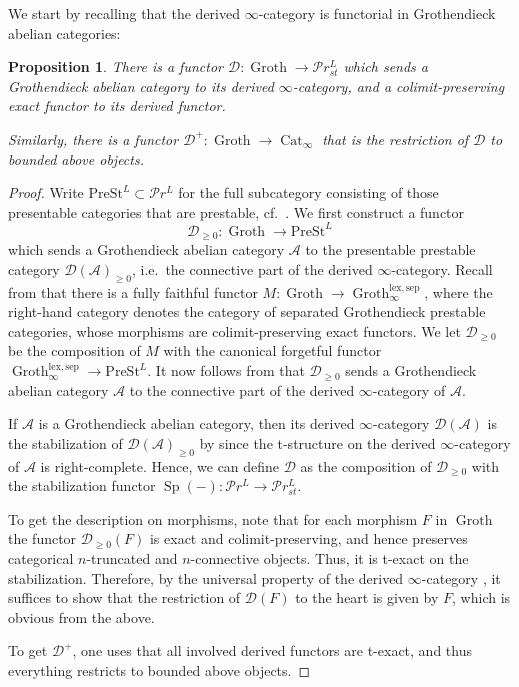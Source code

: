 \documentclass{article}
\theoremstyle{definition}
\theoremstyle{definition}
\theoremstyle{definition}
\theoremstyle{plain}
\theoremstyle{plain}
\theoremstyle{plain}
\theoremstyle{plain}
\theoremstyle{plain}
\theoremstyle{plain}
\newtheorem{prop}[defn]{Proposition}
\theoremstyle{plain}
\theoremstyle{plain}
\theoremstyle{remark}
\theoremstyle{remark}
\theoremstyle{plain}
\theoremstyle{plain}
\theoremstyle{plain}
\theoremstyle{plain}
\theoremstyle{plain}
\newcommand{\Sp}{\operatorname{Sp}}
\newcommand{\Cat}[1]{\mathcal{#1}}
\newcommand{\CatInf}{\operatorname{Cat}_{\infty}}
\newcommand{\Groth}{\operatorname{Groth}}
\newcommand{\PrL}{\mathcal{P}r^{L}}
\newcommand{\PrSt}{\mathcal{P}r^{L}_{st}}
\newcommand{\PreSt}{\mathrm{PreSt}^L}
\begin{document}
We start by recalling that the derived $\infty$-category is functorial in Grothendieck abelian categories:
\begin{prop} \label{lem:zariski:derived-cat}
    There is a functor $\Cat D \colon \Groth \to \PrSt$ 
    which sends a Grothendieck abelian category to its derived $\infty$-category,
    and a colimit-preserving exact functor
    to its derived functor.

    Similarly, there is a functor $\Cat D^+ \colon \Groth \to \CatInf$ 
    that is the restriction of $\Cat D$ to bounded above objects.
\end{prop}
\begin{proof}
    Write $\PreSt \subset \PrL$ for the full subcategory consisting of those 
    presentable categories that are prestable, cf.\ \cite[Definition C.1.2.1]{sag}.
    We first construct a functor 
    \begin{equation*}
        \Cat D_{\ge 0} \colon \Groth \to \PreSt
    \end{equation*}
    which sends a Grothendieck abelian category $\Cat A$
    to the presentable prestable category $\Cat D(\Cat A)_{\ge 0}$,
    i.e.\ the connective part of the derived $\infty$-category.
    Recall from \cite[Proposition C.5.4.5]{sag}
    that there is a fully faithful functor $M \colon \Groth \to \Groth^{\mathrm{lex}, \mathrm{sep}}_\infty$,
    where the right-hand category denotes the category of separated Grothendieck prestable 
    categories, whose morphisms are colimit-preserving exact functors.
    We let $\Cat D_{\ge 0}$ be the composition of $M$ with the canonical forgetful functor $\Groth^{\mathrm{lex}, \mathrm{sep}}_\infty \to \PreSt$.
    It now follows from \cite[Propositions C.5.4.5 and C.5.3.2]{sag}
    that $\Cat D_{\ge 0}$ sends a Grothendieck abelian category $\Cat A$ to the connective part of the derived $\infty$-category of $\Cat A$.

    If $\Cat A$ is a Grothendieck abelian category,
    then its derived $\infty$-category $\Cat D(\Cat A)$ is the stabilization of $\Cat D(\Cat A)_{\ge 0}$
    by \cite[Remark C.1.2.10]{sag} since the t-structure on the derived $\infty$-category of $\Cat A$ is right-complete.
    Hence, we can define $\Cat D$ as the composition of $\Cat D_{\ge 0}$ with the stabilization functor 
    $\Sp(-) \colon \PrL \to \PrSt$.

    To get the description on morphisms, note that for each morphism $F$ in $\Groth$ the functor
    $\Cat D_{\ge 0}(F)$ is exact and colimit-preserving,
    and hence preserves categorical $n$-truncated and $n$-connective objects.
    Thus, it is t-exact on the stabilization.
    Therefore, by the universal property of the derived $\infty$-category \cite[Proposition A.2]{cartmod},
    it suffices to show that the restriction of $\Cat D(F)$ to the heart is given by $F$,
    which is obvious from the above.

    To get $\Cat D^+$, one uses that all involved derived functors are t-exact,
    and thus everything restricts to bounded above objects.
\end{proof}
\end{document}
